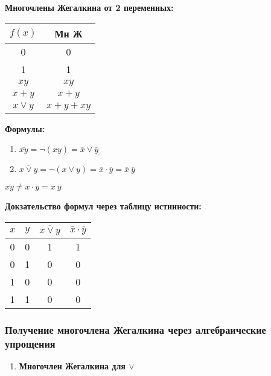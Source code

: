 \documentclass[russian]{lecture-notes}
\begin{document}
\begin{sloppypar}
\textbf{Многочлены Жегалкина от 2 переменных:}

\begin{table}[h!]
	\centering
	\begin{tabular}{|c|c|}
		\hline
		$f(x)$ & Мн Ж  \\ \hline
		0    		   & 0     \\ \hline
		1    		   & 1     \\ \hline
		$xy$          & $xy$     \\ \hline
		$x + y$ & $x + y$ \\ \hline
		$x \lor y$ & $x + y + xy$ \\ \hline
	\end{tabular}
\end{table}

\textbf{Формулы:}

\begin{enumerate}
	\item 	$\overline{xy} = \neg (xy) = \overline{x} \lor \overline{y} $
	\item $\overline{x \lor y} = \neg (x \lor y) = \overline{x} \cdot \overline{y} = \overline{x} \: \overline{y}$
\end{enumerate}

\begin{remark}
	$\overline{xy} \neq \overline{x} \cdot \overline{y} = \overline{x} \: \overline{y}$
\end{remark}

\textbf{Докзательство формул через таблицу истинности:}

\begin{table}[h!]
	\centering	
	\begin{tabular}{|c|c|c|c|}
		\hline
		$x$ & $y$ & $\overline{x \lor y}$ & $\overline{x} \cdot \overline{y}$ \\ \hline
		0 & 0 & 1   & 1   \\ \hline
		0 & 1 & 0   & 0   \\ \hline
		1 & 0 & 0   & 0   \\ \hline
		1 & 1 & 0   & 0   \\ \hline
\end{tabular}
\end{table}

\subsubsection{Получение многочлена Жегалкина через алгебраические упрощения}

\begin{enumerate}
	\item{
		\textbf{Многочлен Жегалкина для $\lor$}

}
\end{enumerate}
\end{sloppypar}
\end{document}
